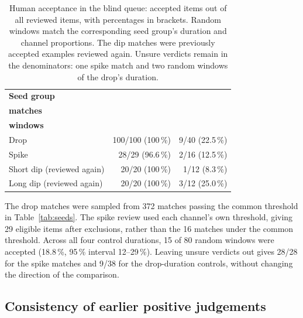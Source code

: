 \begin{table}[htbp]
\caption[{Human acceptance in the blind queue.}]{Human acceptance in the blind queue: accepted items out of all reviewed items, with percentages in brackets. Random windows match the corresponding seed group's duration and channel proportions. The dip matches were previously accepted examples reviewed again. Unsure verdicts remain in the denominators: one spike match and two random windows of the drop's duration.}
\label{tab:seedacceptance}
\small
\centering
\begin{tabularx}{\textwidth}{@{}Xrr@{}}
\toprule
\textbf{Seed group} & \makecell[r]{\textbf{Accepted search}\\\textbf{matches}} & \makecell[r]{\textbf{Accepted random}\\\textbf{windows}}\\
\midrule
Drop & 100/100 (100\,\%) & 9/40 (22.5\,\%)\\
Spike & 28/29 (96.6\,\%) & 2/16 (12.5\,\%)\\
Short dip (reviewed again) & 20/20 (100\,\%) & 1/12 (8.3\,\%)\\
Long dip (reviewed again) & 20/20 (100\,\%) & 3/12 (25.0\,\%)\\
\bottomrule
\end{tabularx}
\end{table}

The drop matches were sampled from 372 matches passing the common threshold in Table~\ref{tab:seeds}. The spike review used each channel's own threshold, giving 29 eligible items after exclusions, rather than the 16 matches under the common threshold. Across all four control durations, 15 of 80 random windows were accepted (18.8\,\%, 95\,\% interval 12--29\,\%). Leaving unsure verdicts out gives 28/28 for the spike matches and 9/38 for the drop-duration controls, without changing the direction of the comparison.


\subsection{Consistency of earlier positive judgements}
\label{sec:seedrepeatability}

